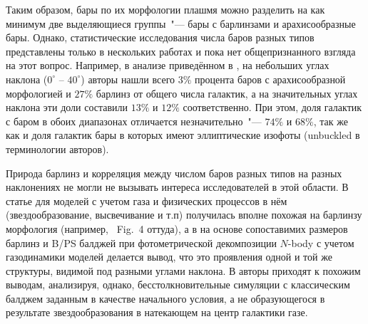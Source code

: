 \documentclass{trlnotes}
\begin{document}
Таким образом, бары по их морфологии плашмя можно разделить на как минимум две выделяющиеся группы~"--- бары с
барлинзами и арахисообразные бары. Однако, статистические исследования числа баров разных типов представлены только в
нескольких работах и пока нет общепризнанного взгляда на этот вопрос. Например, в анализе приведённом в
\cite{li2017a}, на небольших углах наклона ($0^\circ$ -- $40^\circ$) авторы нашли всего $3\%$ процента баров с
арахисообразной морфологией и $27\%$ барлинз от общего числа галактик, а на значительных углах наклона эти доли
составили $13\%$ и $12\%$ соответственно. При этом, доля галактик с баром в обоих диапазонах отличается незначительно~"--- $74\%$ и $68\%$, так же как и доля галактик бары в которых имеют эллиптические изофоты (unbuckled в терминологии авторов). 

Природа барлинз и корреляция между числом баров разных типов на разных наклонениях не могли не вызывать интереса
исследователей в этой области. В статье \cite{athanassoula2013a} для моделей с учетом газа и физических процессов 
в нём (звездообразование, высвечивание и т.п) получилась вполне похожая на барлинзу морфология (например, ~Fig.~4 
оттуда), а в \cite{athanassoula2015} на основе сопоставимих размеров барлинз и B/PS балджей при фотометрической 
декомпозиции $N$-body с учетом газодинамики моделей делается вывод, что это проявления одной и той же структуры, 
видимой под разными углами наклона. В \cite{salo2017} авторы приходят к похожим выводам, анализируя, 
однако, бесстолкновительные симуляции с классическим балджем заданным в качестве начального условия, а не 
образующегося в результате звездообразования в натекающем на центр галактики газе. 
\end{document}
